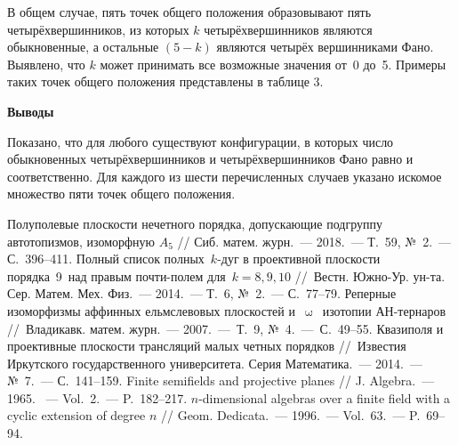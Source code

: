 В общем случае, пять точек общего положения образовывают пять  четырёхвершинников, из которых $k$ четырёхвершинников являются обыкновенные, а остальные $(5-k)$ являются четырёх вершинниками Фано. Выявлено, что $k$ может принимать все возможные значения от~0 до~5. Примеры таких точек общего положения представлены в таблице 3.


\textbf{Выводы}

Показано, что для любого существуют конфигурации, в которых число обыкновенных четырёхвершинников и четырёхвершинников Фано равно и
соответственно. Для каждого из шести перечисленных случаев указано искомое множество пяти точек общего положения.




\begin{thebibliography}{99}

\bibitem{} Полуполевые плоскости нечетного порядка, допускающие подгруппу автотопизмов, изоморфную $A_5$ // Сиб. матем. журн.~--- 2018.~--- Т.~59, №~2.~--- С.~396--411.
\bibitem{} Полный список полных $k$-дуг в проективной плоскости порядка 9 над правым почти-полем для $k=8, 9, 10$ // Вестн. Южно-Ур. ун-та. Сер. Матем. Мех. Физ.~--- 2014.~--- Т.~6, №~2.~--- С.~77--79.
\bibitem{} Реперные изоморфизмы аффинных ельмслевовых плоскостей и $\upomega$ изотопии АН-тернаров // Владикавк. матем. журн.~--- 2007.~--- Т.~9, №~4.~--- С.~49--55.
\bibitem{} Квазиполя и проективные плоскости трансляций малых четных порядков // Известия Иркутского государственного университета. Серия Математика.~--- 2014.~--- №~7.~--- С.~141--159.
\bibitem{} Finite semifields and projective planes // J. Algebra.~--- 1965. ~--- Vol.~2.~--- P.~182--217.
\bibitem{} $n$-dimensional algebras over a finite field with a cyclic extension of degree $n$ // Geom. Dedicata.~--- 1996.~--- Vol.~63.~--- P.~69--94.


\end{thebibliography}
